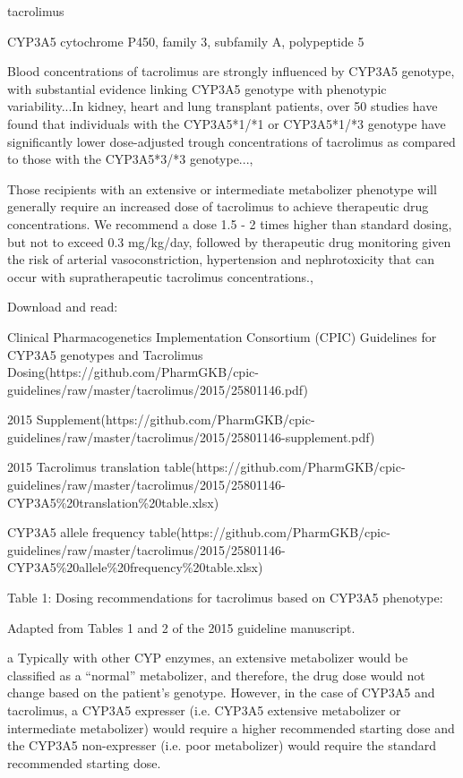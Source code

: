 \documentclass{resume} %
\begin{document}
\begin{rSection}{ tacrolimus }
\begin{rSubsection}{ CYP3A5 }{ cytochrome P450, family 3, subfamily A, polypeptide 5 }{}{}
\item Blood concentrations of tacrolimus are strongly influenced by CYP3A5 genotype, with substantial evidence linking CYP3A5 genotype with phenotypic variability...In kidney, heart and lung transplant patients, over 50 studies have found that individuals with the CYP3A5*1/*1 or CYP3A5*1/*3 genotype have significantly lower dose-adjusted trough concentrations of tacrolimus as compared to those with the CYP3A5*3/*3 genotype..., 
 \newline
\item Those recipients with an extensive or intermediate metabolizer phenotype will generally require an increased dose of tacrolimus to achieve therapeutic drug concentrations. We recommend a dose 1.5 - 2 times higher than standard dosing, but not to exceed 0.3 mg/kg/day, followed by therapeutic drug monitoring given the risk of arterial vasoconstriction, hypertension and nephrotoxicity that can occur with supratherapeutic tacrolimus concentrations.,  
 \newline
\item Download and read:  
 \newline
\item Clinical Pharmacogenetics Implementation Consortium (CPIC) Guidelines for CYP3A5 genotypes and Tacrolimus Dosing(https://github.com/PharmGKB/cpic-guidelines/raw/master/tacrolimus/2015/25801146.pdf) 
 \newline
\item 2015 Supplement(https://github.com/PharmGKB/cpic-guidelines/raw/master/tacrolimus/2015/25801146-supplement.pdf)
 \newline
\item 2015 Tacrolimus translation table(https://github.com/PharmGKB/cpic-guidelines/raw/master/tacrolimus/2015/25801146-CYP3A5\%20translation\%20table.xlsx)
 \newline
\item CYP3A5 allele frequency table(https://github.com/PharmGKB/cpic-guidelines/raw/master/tacrolimus/2015/25801146-CYP3A5\%20allele\%20frequency\%20table.xlsx)
 \newline
\item Table 1: Dosing recommendations for tacrolimus based on CYP3A5 phenotype:
 \newline
\item Adapted from Tables 1 and 2 of the 2015 guideline manuscript.
 \newline
\item a Typically with other CYP enzymes, an extensive metabolizer would be classified as a “normal” metabolizer, and therefore, the drug dose would not change based on the patient’s genotype. However, in the case of CYP3A5 and tacrolimus, a CYP3A5 expresser (i.e. CYP3A5 extensive metabolizer or intermediate metabolizer) would require a higher recommended starting dose and the CYP3A5 non-expresser (i.e. poor metabolizer) would require the standard recommended starting dose.

\end{rSubsection}
\end{rSection}
\end{document}
